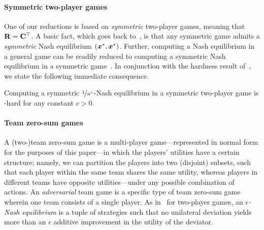 \paragraph{Symmetric two-player games} One of our reductions is based on \emph{symmetric} two-player games, meaning that $\mathbf{R} = \mathbf{C}^\top$. A basic fact, which goes back to~\citet{nash1951non}, is that any symmetric game admits a \emph{symmetric} Nash equilibrium $({\bm{x}}^*, {\bm{x}}^*)$. Further, computing a Nash equilibrium in a general game can be readily reduced to computing a symmetric Nash equilibrium in a symmetric game~\citep[Theorem 2.4]{Nisan07:Algorithmic}. In conjunction with the hardness result of~\citet{Chen09:Settling}, we state the following immediate consequence.

\begin{theorem} \label{theorem:PPAD_for _symmetric}
    Computing a symmetric $\nicefrac{1}{n^c}$-Nash equilibrium in a symmetric two-player game is \PPAD-hard for any constant $c > 0$.
\end{theorem}

\paragraph{Team zero-sum games} A (two-)team zero-sum game is a multi-player game---represented in normal form for the purposes of this paper---in which the players' utilities have a certain structure; namely, we can partition the players into two (disjoint) subsets, such that each player within the same team shares the same utility, whereas players in different teams have opposite utilities---under any possible combination of actions. An \emph{adversarial} team game is a specific type of team zero-sum game wherein one team consists of a single player. As in~ for two-player games, an \emph{$\epsilon$-Nash equilibrium} is a tuple of strategies such that no unilateral deviation yields more than an $\epsilon$ additive improvement in the utility of the deviator.